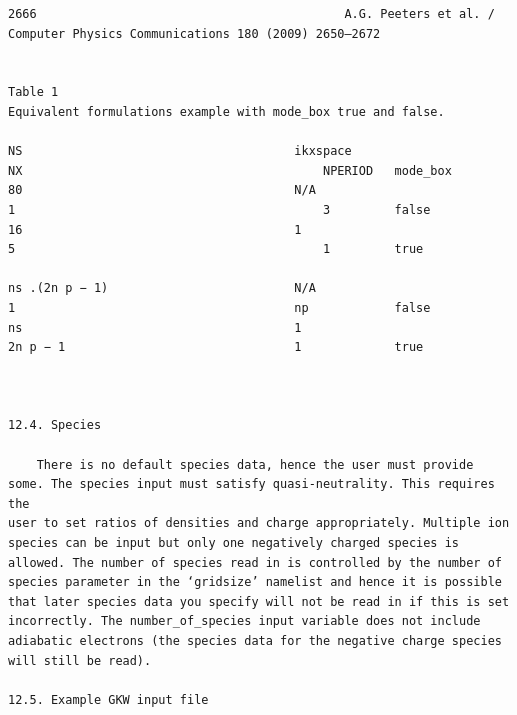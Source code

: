 \documentclass[a4paper]{article}
\newcommand{\gkwpagefont}{\fontsize{6.0pt}{7.55pt}\selectfont}
\begin{document}
\begin{Verbatim}[fontsize=\gkwpagefont]
2666                                           A.G. Peeters et al. / Computer Physics Communications 180 (2009) 2650–2672


Table 1
Equivalent formulations example with mode_box true and false.

NS                                      ikxspace                                NX                                          NPERIOD   mode_box
80                                      N/A                                     1                                           3         false
16                                      1                                       5                                           1         true

ns .(2n p − 1)                          N/A                                     1                                       np            false
ns                                      1                                       2n p − 1                                1             true



12.4. Species

    There is no default species data, hence the user must provide some. The species input must satisfy quasi-neutrality. This requires the
user to set ratios of densities and charge appropriately. Multiple ion species can be input but only one negatively charged species is
allowed. The number of species read in is controlled by the number of species parameter in the ‘gridsize’ namelist and hence it is possible
that later species data you specify will not be read in if this is set incorrectly. The number_of_species input variable does not include
adiabatic electrons (the species data for the negative charge species will still be read).

12.5. Example GKW input file


\end{Verbatim}
\end{document}
